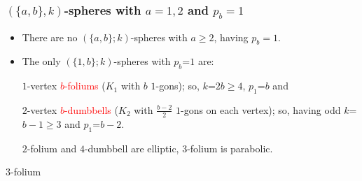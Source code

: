 \documentclass{beamer}
\begin{document}
\begin{frame}\frametitle{$(\{a,b\},k)$-spheres with $a=1,2$ and 
$p_b=1$}
\begin{itemize}

\item
There are no
 $(\{a,b\};k)$-spheres
 with $a\ge 2$, having  $p_b= 1$.
 \item  
The only  $(\{1,b\};k)$-spheres
 with $p_b$=$1$ are:
 
$1$-vertex \textcolor{red}{$b$-foliums} ($K_1$ with $b$ $1$-gons); so,  $k$=$2b$$\ge$$ 4$, $p_1$=$b$ and

$2$-vertex \textcolor{red}{$b$-dumbbells} ($K_2$ with $\frac{b-2}{2}$ $1$-gons on each vertex); so,
having  odd $k$=$b-1$$\ge$$ 3$ and  $p_1$=$b-2$.

 $2$-folium and  $4$-dumbbell are  elliptic,   $3$-folium is 
parabolic. 
\end{itemize}

\begin{center}
\begin{minipage}[b]{25mm}
\centering
{}\par
$3$-folium
\end{minipage} 

\end{center}

\end{frame}  
\end{document}
